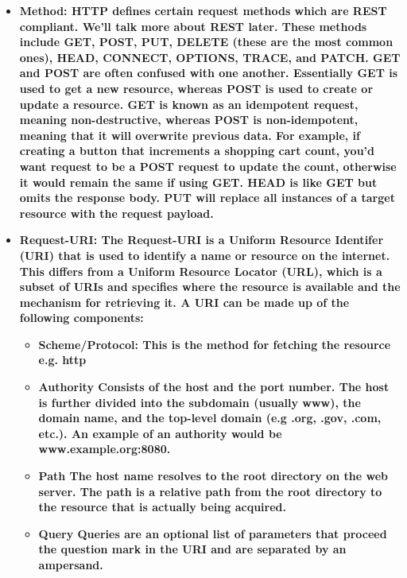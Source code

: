 \documentclass{article}
\begin{document}
\begin{itemize}

\item{%
   \bfseries{Method:} \mdseries HTTP defines certain request methods which are REST compliant. We'll talk more 
   about REST later. These methods include GET, POST, PUT, DELETE (these are the most common ones), HEAD, 
   CONNECT, OPTIONS, TRACE, and PATCH. GET and POST are often confused with one another. Essentially GET is
   used to get a new resource, whereas POST is used to create or update a resource. GET is known as an 
   idempotent request, meaning non-destructive, whereas POST is non-idempotent, meaning that it will 
   overwrite previous data. For example, if creating a button that increments a shopping cart count, you'd 
   want request to be a POST request to update the count, otherwise it would remain the same if using GET. 
   HEAD is like GET but omits the response body. PUT will replace all instances of a target resource with 
   the request payload. 
}

\item{%
   \bfseries{Request-URI:} \mdseries The Request-URI is a Uniform Resource Identifer (URI) that is used to 
   identify a name or resource on the internet. This differs from a Uniform Resource Locator (URL), which is a 
   subset of URIs and specifies where the resource is available and the mechanism for retrieving it. A URI can 
   be made up of the following components: 

   \begin{itemize}

   \item{%
      \bfseries{Scheme/Protocol:} \mdseries This is the method for fetching the resource e.g. http
   }

   \item{%
      \bfseries{Authority} \mdseries Consists of the host and the port number. The host is further divided
      into the subdomain (usually www), the domain name, and the top-level domain 
      (e.g .org, .gov, .com, etc.). An example of an authority would be www.example.org:8080.
   }

   \item{%
      \bfseries{Path} \mdseries The host name resolves to the root directory on the web server. The path is a 
      relative path from the root directory to the resource that is actually being acquired. 
   }

   \item{%
      \bfseries{Query} \mdseries Queries are an optional list of parameters that proceed the question mark in 
      the URI and are separated by an ampersand. 
   }


\end{itemize}}
\end{itemize}
\end{document}
